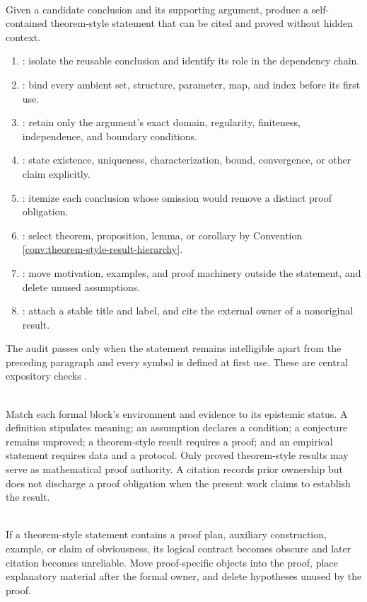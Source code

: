 \begin{process} \label{proc:theorem-statement-audit} \\
Given a candidate conclusion and its supporting argument, produce a self-contained theorem-style statement that can be cited and proved without hidden context.
\begin{enumerate}[label=(\roman*)]
\setlength{\itemsep}{0pt}
\item {}: isolate the reusable conclusion and identify its role in the dependency chain.
\item {}: bind every ambient set, structure, parameter, map, and index before its first use.
\item {}: retain only the argument's exact domain, regularity, finiteness, independence, and boundary conditions.
\item {}: state existence, uniqueness, characterization, bound, convergence, or other claim explicitly.
\item {}: itemize each conclusion whose omission would remove a distinct proof obligation.
\item {}: select theorem, proposition, lemma, or corollary by Convention \ref{conv:theorem-style-result-hierarchy}.
\item {}: move motivation, examples, and proof machinery outside the statement, and delete unused assumptions.
\item {}: attach a stable title and label, and cite the external owner of a nonoriginal result.
\end{enumerate}
The audit passes only when the statement remains intelligible apart from the preceding paragraph and every symbol is defined at first use. These are central expository checks \citep{knuth1988mathematicalwriting}.
\end{process}

\begin{principle} \label{princ:claim-authority-separation} \\
Match each formal block's environment and evidence to its epistemic status. A definition stipulates meaning; an assumption declares a condition; a conjecture remains unproved; a theorem-style result requires a proof; and an empirical statement requires data and a protocol. Only proved theorem-style results may serve as mathematical proof authority. A citation records prior ownership but does not discharge a proof obligation when the present work claims to establish the result.
\end{principle}

\begin{warning} \label{warn:statement-proof-contamination} \\
If a theorem-style statement contains a proof plan, auxiliary construction, example, or claim of obviousness, its logical contract becomes obscure and later citation becomes unreliable. Move proof-specific objects into the proof, place explanatory material after the formal owner, and delete hypotheses unused by the proof.
\end{warning}
